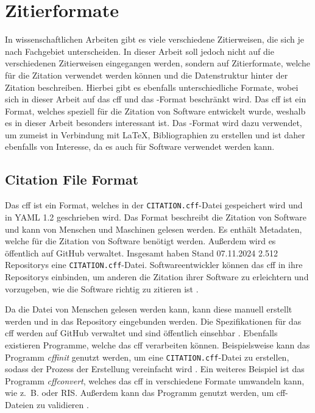 \section{Zitierformate}
\label{sec:zitierformate}
In wissenschaftlichen Arbeiten gibt es viele verschiedene Zitierweisen, die sich je nach Fachgebiet unterscheiden.
In dieser Arbeit soll jedoch nicht auf die verschiedenen Zitierweisen eingegangen werden, sondern auf Zitierformate, welche für die Zitation verwendet werden können und die Datenstruktur hinter der Zitation beschreiben.
Hierbei gibt es ebenfalls unterschiedliche Formate, wobei sich in dieser Arbeit auf das \gls{cff} und das -Format beschränkt wird.
Das \gls{cff} ist ein Format, welches speziell für die Zitation von Software entwickelt wurde, weshalb es in dieser Arbeit besonders interessant ist.
Das -Format wird dazu verwendet, um zumeist in Verbindung mit \LaTeX{}, Bibliographien zu erstellen und ist daher ebenfalls von Interesse, da es auch für Software verwendet werden kann.

\subsection{Citation File Format}
\label{subsec:citation-file-format}
Das \gls{cff} ist ein Format, welches in der \texttt{CITATION.cff}-Datei gespeichert wird und in YAML 1.2 geschrieben wird. 
Das Format beschreibt die Zitation von Software und kann von Menschen und Maschinen gelesen werden.
Es enthält Metadaten, welche für die Zitation von Software benötigt werden.
Außerdem wird es öffentlich auf GitHub verwaltet.
Insgesamt haben Stand 07.11.2024 2.512 Repositorys eine \texttt{CITATION.cff}-Datei.
Softwareentwickler können das \gls{cff} in ihre Repositorys einbinden, um anderen die Zitation ihrer Software zu erleichtern und vorzugeben, wie die Software richtig zu zitieren ist \autocite{druskat_citation_2021}.

Da die Datei von Menschen gelesen werden kann, kann diese manuell erstellt werden und in das Repository eingebunden werden.
Die Spezifikationen für das \gls{cff} werden auf GitHub verwaltet und sind öffentlich einsehbar \autocite{druskat_citation_2021}.
Ebenfalls existieren Programme, welche das \gls{cff} verarbeiten können.
Beispielsweise kann das Programm \emph{cffinit} genutzt werden, um eine \texttt{CITATION.cff}-Datei zu erstellen, sodass der Prozess der Erstellung vereinfacht wird \autocite{spaaks_cffinit_2023}.
Ein weiteres Beispiel ist das Programm \emph{cffconvert}, welches das \gls{cff} in verschiedene Formate umwandeln kann, wie z. B.  oder RIS.
Außerdem kann das Programm genutzt werden, um \gls{cff}-Dateien zu validieren \autocite{spaaks_cffconvert_2021}.

